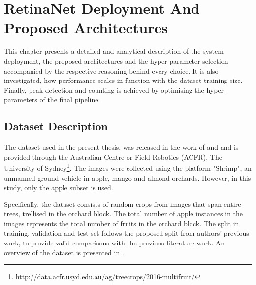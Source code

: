 \chapter{RetinaNet Deployment And Proposed Architectures} \label{Chapter:Experiment}
This chapter presents a detailed and analytical description of the system deployment, the proposed architectures and the hyper-parameter selection accompanied by the respective reasoning behind every choice. It is also investigated, how performance scales in function with the dataset training size. Finally, peak detection and counting is achieved by optimising the hyper-parameters of the final pipeline.

\section{Dataset Description}
The dataset used in the present thesis, was released in the work of \cite{bargoti2017image} and \cite{bargoti2017deep} and is provided through the Australian Centre or Field Robotics (ACFR), The University of Sydney\footnote{\url{http://data.acfr.usyd.edu.au/ag/treecrops/2016-multifruit/}}. The images were collected using the platform "Shrimp", an unmanned ground vehicle in apple, mango and almond orchards. However, in this study, only the apple subset is used.

Specifically, the dataset consists of random crops from images that span entire trees, trellised in the orchard block. The total number of apple instances in the images represents the total number of fruits in the orchard block. The split in training, validation and test set follows the proposed split from authors' previous work, to provide valid comparisons with the previous literature work. An overview of the dataset is presented in .

\begin{table}[!htb]
  \centering
  \caption{ACFR dataset description}
  \label{tab1}
\end{table}

